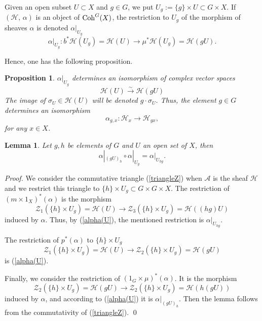 \documentclass[xypic,amscd,syntonly,amssymb,verbatim,12pt]{amsart}
\theoremstyle{plain}
\newtheorem{Prop}[Thm]{Proposition}
\newtheorem{Lem}[Thm]{Lemma}
\theoremstyle{definition}
\theoremstyle{remark}
\numberwithin{equation}{section}
\begin{document}
Given an open subset $U\subset X$ and $g\in G$, we put
$U_g:=\{g\}\times U\subset G\times X.$ If $({\mathcal H},\,\alpha)$ is an object of ${\rm Coh}^G(X)$,
 the restriction to $U_g$ of the morphism of sheaves
$\alpha$ is denoted  $\alpha|_{U_g}$
\begin{equation}\label{alpha(U}
\alpha|_{U_g}:b^*{\mathcal H}(U_g)={\mathcal H}(U)\longrightarrow
\mu^*{\mathcal H}(U_g)={\mathcal H}(gU).
\end{equation}

 Hence, one has the following proposition.
 \begin{Prop}\label{Propiso1}
  $\alpha|_{U_g}$ determines an isomorphism of complex vector spaces
 \begin{equation}\label{iso1}
 
 {\mathcal H}(U) \stackrel{\sim}{\longrightarrow} {\mathcal H}(gU)
 \end{equation}
The image of $\sigma_U\in{\mathcal H}(U)$ will be denoted
$g\cdot\sigma_U$. Thus, the element $g\in G$ determines an
isomorphism
\begin{equation}\label{mathcalHx}
 \alpha_{g,x}:{\mathcal H}_x\to {\mathcal H}_{gx},
\end{equation}
 for any $x\in X$.
 \end{Prop}



\begin{Lem}\label{Lema}
Let $g,h$ be elements of $G$ and $U$ an open set of $X$, then
$$\alpha|_{(gU)_h}\circ\alpha|_{U_g}=\alpha|_{U_{hg}}.$$
\end{Lem}

{\it Proof.} We consider   the commutative triangle
(\ref{triangleZ}) when ${\mathcal A}$ is the sheaf ${\mathcal H}$
and we restrict this triangle to $\{h\}\times U_g\subset
G\times G\times X$. The restriction of $(m\times 1_X)^*(\alpha)$
is  the morphism
$${\mathcal Z}_1(\{h\}\times U_g )={\mathcal H}(U)\longrightarrow {\mathcal Z}_3(\{h\}\times U_g )={\mathcal
H}((hg)U)$$
induced by $\alpha$. Thus,  by (\ref{alpha(U}), the mentioned restriction is
 $\alpha|_{U_{hg}}$.

 The restriction of $p^*(\alpha)$ to  $\{h\}\times U_g$
 $${\mathcal Z}_1(\{h\}\times U_g )={\mathcal H}(U)\longrightarrow {\mathcal Z}_2(\{h\}\times U_g )={\mathcal
H}(gU)$$
is (\ref{alpha(U}).

Finally, we consider the restriction of $(1_G\times\mu)^*(\alpha)$. It is the morphism
 $${\mathcal Z}_2(\{h\}\times U_g )={\mathcal H}(gU)\longrightarrow {\mathcal Z}_2(\{h\}\times U_g )={\mathcal
H}(h(gU))$$
 induced by $\alpha$, and according to (\ref{alpha(U}) it is $\alpha|_{(gU)_h}$.
Then the lemma follows from   the commutativity of (\ref{triangleZ}).
 \qed
\end{document}
